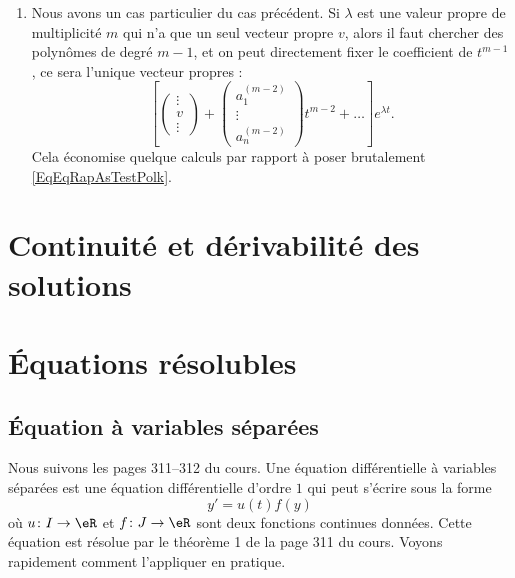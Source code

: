 \begin{enumerate}
\item\label{ItemRapSystDe}
Nous avons un cas particulier du cas précédent. Si $\lambda$ est une valeur propre de multiplicité $m$ qui n'a que un seul vecteur propre $v$, alors il faut chercher des polynômes de degré $m-1$, et on peut directement fixer le coefficient de $t^{m-1}$, ce sera l'unique vecteur propres :
\begin{equation}
\left[
	\begin{pmatrix}
	\vdots	\\ 
	v	\\ 
	\vdots	
\end{pmatrix}+
\begin{pmatrix}
	a_1^{(m-2)}	\\ 
	\vdots	\\ 
	a_n^{(m-2)}	
\end{pmatrix}t^{m-2}+\ldots
\right] e^{\lambda t}.
\end{equation}
Cela économise quelque calculs par rapport à poser brutalement \eqref{EqEqRapAsTestPolk}.

\end{enumerate}
\let\theenumi\oldTheEnumi

					\section{Continuité et dérivabilité des solutions}

					\section{Équations résolubles}

\subsection{Équation à variables séparées}
\label{sec:varsep}


Nous suivons les pages 311--312 du cours. Une équation différentielle à variables séparées est une équation différentielle d'ordre $1$ qui peut s'écrire sous la forme
\begin{equation}		\label{EqGeneTheSep}
	y'=u(t)f(y)
\end{equation}
où $u\colon I\to \eR$ et $f\colon J\to \eR$ sont deux fonctions continues données. Cette équation est résolue par le théorème 1 de la page 311 du cours. Voyons rapidement comment l'appliquer en pratique. 

